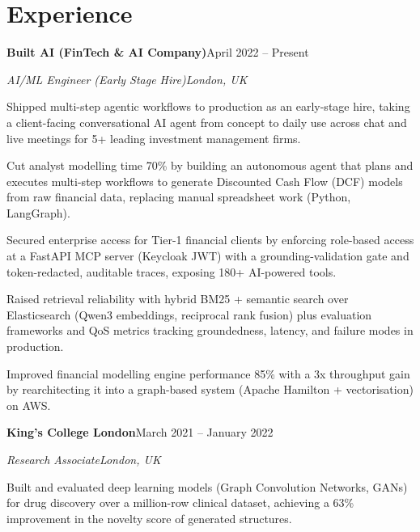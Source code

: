 \documentclass[10pt,a4paper]{article}
\newcommand{\entry}[4]{%
  {\color{company}\bfseries #1}\hfill {\color{muted}#2}\par
  \vspace{1pt}
  {\itshape #3}\hfill {\color{muted}\itshape #4}\par
  \vspace{3pt}%
}
\begin{document}
\section{Experience}
\entry{Built AI (FinTech \& AI Company)}{April 2022 -- Present}{AI/ML Engineer (Early Stage Hire)}{London, UK}
\begin{tight}
  \item Shipped multi-step agentic workflows to production as an early-stage hire, taking a client-facing conversational AI agent from concept to daily use across chat and live meetings for 5+ leading investment management firms.
  \item Cut analyst modelling time 70\% by building an autonomous agent that plans and executes multi-step workflows to generate Discounted Cash Flow (DCF) models from raw financial data, replacing manual spreadsheet work (Python, LangGraph).
  \item Secured enterprise access for Tier-1 financial clients by enforcing role-based access at a FastAPI MCP server (Keycloak JWT) with a grounding-validation gate and token-redacted, auditable traces, exposing 180+ AI-powered tools.
  \item Raised retrieval reliability with hybrid BM25 + semantic search over Elasticsearch (Qwen3 embeddings, reciprocal rank fusion) plus evaluation frameworks and QoS metrics tracking groundedness, latency, and failure modes in production.
  \item Improved financial modelling engine performance 85\% with a 3x throughput gain by rearchitecting it into a graph-based system (Apache Hamilton + vectorisation) on AWS.
\end{tight}

\entry{King's College London}{March 2021 -- January 2022}{Research Associate}{London, UK}
\begin{tight}
  \item Built and evaluated deep learning models (Graph Convolution Networks, GANs) for drug discovery over a million-row clinical dataset, achieving a 63\% improvement in the novelty score of generated structures.
\end{tight}

\end{document}
